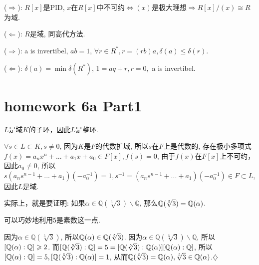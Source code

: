 \documentclass{report}
\begin{document}

\sol
{

    ($\Rightarrow$): $R[x]$是PID, $x$在$R[x]$中不可约$\iff (x)$是极大理想$\Rightarrow R[x]/(x) \cong R$为域. 

    ($\Leftarrow$): $R$是域, 同高代方法.
    
}


\sol
{

    ($\Rightarrow$): a is invertibel, $ab=1$, $\forall r\in R^*, r=(rb)a, \delta(a) \leq \delta (r)$.

    ($\Leftarrow$): $ \delta(a)= \min \delta(R^*)$, $1=aq+r, r=0, $ a is invertibel. 
}

\section{homework 6a Part1}


\sol
{

    $L$是域$K$的子环，因此$L$是整环.

    $\forall s \in L\subset K, s \neq 0$, 因为$K$是$F$的代数扩域, 所以$s$在$F$上是代数的, 存在极小多项式$f(x)=a_nx^n+...+a_1x+a_0 \in F[x], f(s)=0$, 由于$f(x)$在$F[x]$上不可约，因此$a_0 \neq 0$, 所以$s(a_ns^{n-1}+...+a_1)(-a_0^{-1})=1, s^{-1}=(a_ns^{n-1}+...+a_1)(-a_0^{-1}) \in F \subset L $, 因此$L$是域.
    
}


\sol
{

    实际上，就是要证明: 如果$\alpha \in \mathbb{Q}(\sqrt[5]{3})\backslash \mathbb{Q}$, 那么$\mathbb{Q}(\sqrt[5]{3})=\mathbb{Q}(\alpha)$.

    可以巧妙地利用$5$是素数这一点.

    因为$\alpha \in \mathbb{Q}(\sqrt[5]{3})$, 所以$\mathbb{Q}(\alpha) \in \mathbb{Q}(\sqrt[5]{3})$. 因为$\alpha \in \mathbb{Q}(\sqrt[5]{3})\backslash \mathbb{Q}$, 所以$[\mathbb{Q}(\alpha): \mathbb{Q}]\geqslant2$. 而$[\mathbb{Q}(\sqrt[5]{3}): \mathbb{Q}]=5=[\mathbb{Q}(\sqrt[5]{3}): \mathbb{Q}(\alpha)][\mathbb{Q}(\alpha): \mathbb{Q}]$, 所以$[\mathbb{Q}(\alpha): \mathbb{Q}]=5, [\mathbb{Q}(\sqrt[5]{3}): \mathbb{Q}(\alpha)]=1$, 从而$\mathbb{Q}(\sqrt[5]{3})=\mathbb{Q}(\alpha), \sqrt[5]{3} \in \mathbb{Q}(\alpha)$.$\diamondsuit$
}
\end{document}
